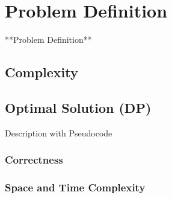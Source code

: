\chapter{Problem Definition}
**Problem Definition**

\section{Complexity}
\section{Optimal Solution (DP)}
Description with Pseudocode
\subsection{Correctness}
\subsection{Space and Time Complexity}